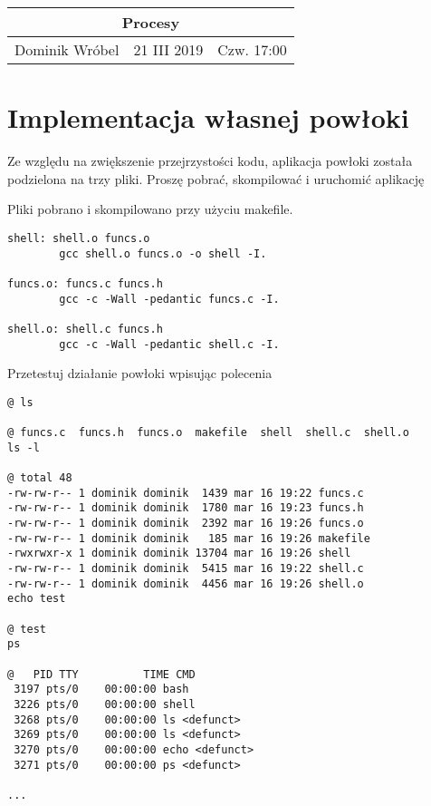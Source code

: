 \documentclass[a4paper,15pt]{article}
\newcommand{\assignment}[2]{
    \begin{tcolorbox}[colback=black!5!white,colframe=black,title={Zadanie #1}]
        #2
    \end{tcolorbox}
}
\begin{document}
\begin{table}
\begin{center}
\begin{tabular}{|c|c|c|}
\hline
\multicolumn{3}{|c|}{\textbf{Procesy}} \\ \hline Dominik Wróbel & 21 III 2019 & Czw. 17:00 \\ \hline

\end{tabular}
\end{center}
\end{table}

\tableofcontents

\newpage
\section{Implementacja własnej powłoki}

\assignment{}{Ze względu na zwiększenie przejrzystości kodu, aplikacja powłoki została podzielona na trzy pliki. Proszę pobrać, skompilować i uruchomić aplikację}

Pliki pobrano i skompilowano przy użyciu makefile.
\begin{lstlisting}[style=CStyle, label=some-code, caption=makefile]
shell: shell.o funcs.o
		gcc shell.o funcs.o -o shell -I.

funcs.o: funcs.c funcs.h
		gcc -c -Wall -pedantic funcs.c -I.
		
shell.o: shell.c funcs.h
		gcc -c -Wall -pedantic shell.c -I.
\end{lstlisting}

\assignment{}{Przetestuj działanie powłoki wpisując polecenia}
\begin{lstlisting}[style=CStyle, label=some-code, caption=testowanie powłoki]
@ ls

@ funcs.c  funcs.h  funcs.o  makefile  shell  shell.c  shell.o
ls -l

@ total 48
-rw-rw-r-- 1 dominik dominik  1439 mar 16 19:22 funcs.c
-rw-rw-r-- 1 dominik dominik  1780 mar 16 19:23 funcs.h
-rw-rw-r-- 1 dominik dominik  2392 mar 16 19:26 funcs.o
-rw-rw-r-- 1 dominik dominik   185 mar 16 19:26 makefile
-rwxrwxr-x 1 dominik dominik 13704 mar 16 19:26 shell
-rw-rw-r-- 1 dominik dominik  5415 mar 16 19:22 shell.c
-rw-rw-r-- 1 dominik dominik  4456 mar 16 19:26 shell.o
echo test

@ test
ps

@   PID TTY          TIME CMD
 3197 pts/0    00:00:00 bash
 3226 pts/0    00:00:00 shell
 3268 pts/0    00:00:00 ls <defunct>
 3269 pts/0    00:00:00 ls <defunct>
 3270 pts/0    00:00:00 echo <defunct>
 3271 pts/0    00:00:00 ps <defunct>

...
\end{lstlisting}
\end{document}
